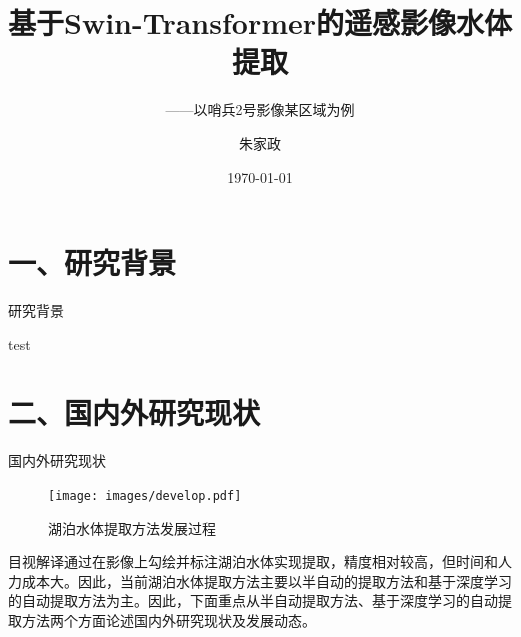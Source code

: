 \documentclass[10pt,aspectratio=169]{beamer} %
\title{基于Swin-Transformer的遥感影像水体提取}
\subtitle{——以哨兵2号影像某区域为例}   %
\author[JiaZheng Zhu]{朱家政}
\institute[Chang'an University]{\large 地球科学与资源学院 \\School of Geosciences \& Resources}
\date{\today}
\begin{document}
	
	\maketitle
	
	\section{一、研究背景}
	
	\begin{frame}[c]{研究背景}
	\begin{block}

				test
	\end{block}
	\end{frame}
	\section{二、国内外研究现状}
	\begin{frame}{国内外研究现状}
		\begin{figure}[htbp] %
			\centering %
			\texttt{[image: images/develop.pdf]} %
			\caption{湖泊水体提取方法发展过程} %
			\label{Fig.main.1} %
		\end{figure}
		\par
		目视解译通过在影像上勾绘并标注湖泊水体实现提取，精度相对较高，但时间和人力成本大。因此，当前湖泊水体提取方法主要以半自动的提取方法和基于深度学习的自动提取方法为主。因此，下面重点从半自动提取方法、基于深度学习的自动提取方法两个方面论述国内外研究现状及发展动态。
	\end{frame}
	
\end{document}
